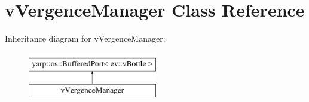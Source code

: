 \hypertarget{classvVergenceManager}{}\section{v\+Vergence\+Manager Class Reference}
\label{classvVergenceManager}
Inheritance diagram for v\+Vergence\+Manager\+:\begin{figure}[H]
\begin{center}
\leavevmode
\includegraphics[height=2.000000cm]{classvVergenceManager}
\end{center}
\end{figure}
